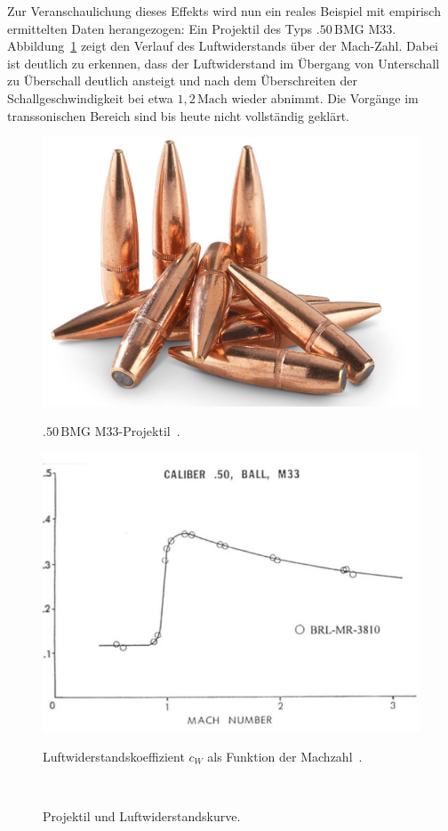 Zur Veranschaulichung dieses Effekts wird nun ein reales Beispiel 
mit empirisch ermittelten Daten herangezogen:
Ein Projektil des Typs $.50\,\text{BMG}$ M33.
Abbildung~\ref{fig:luftwiderstand_50-M33} zeigt den Verlauf
des Luftwiderstands über der Mach-Zahl.
Dabei ist deutlich zu erkennen, dass der Luftwiderstand 
im Übergang von Unterschall zu Überschall 
deutlich ansteigt und nach dem Überschreiten der 
Schallgeschwindigkeit bei etwa $1{,}2\,\text{Mach}$ 
wieder abnimmt.
Die Vorgänge im transsonischen Bereich sind bis heute 
nicht vollständig geklärt.
\begin{figure}
    \centering
    \begin{minipage}[t]{0.4\textwidth}
        \centering
        \includegraphics[width=\linewidth]{papers/ueberschall/figures/50-cal_projectile.jpg}
        \caption*{$.50\,\text{BMG}$ M33-Projektil~\cite{ArmoryFarm50BMG}.}
    \end{minipage}
    \hfill
    \begin{minipage}[t]{0.55\textwidth}
        \centering
        \includegraphics[width=\linewidth]{papers/ueberschall/figures/50-M33 Geschoss.jpg}
        \caption*{Luftwiderstandskoeffizient $c_W$ als Funktion der Machzahl~\cite{Mittelkaliber2020}.}
    \end{minipage}
    \caption{Projektil und Luftwiderstandskurve.}
    ~\label{fig:luftwiderstand_50-M33}
\end{figure}

